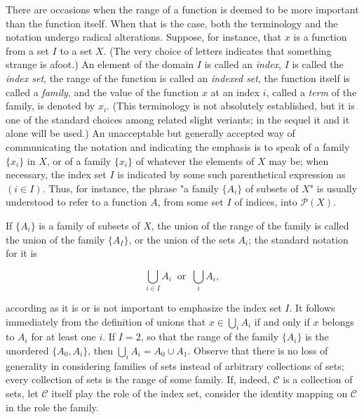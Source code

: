 There are occasions when the range of a function is deemed to be more important than the function itself. When that is the case, both the terminology and the notation undergo radical alterations. Suppose, for instance, that $x$ is a function from a set $I$ to a set $X$. (The very choice of letters indicates that something strange is afoot.) An element of the domain $I$ is called an \textit{index}, $I$ is called the \textit{index set}, the range of the function is called an \textit{indexed set}, the function itself is called a \textit{family}, and the value of the function $x$ at an index $i$, called a \textit{term} of the family, is denoted by $x_{i}$. (This terminology is not absolutely established, but it is one of the standard choices among related slight veriants; in the sequel it and it alone will be used.) An unacceptable but generally accepted way of communicating the notation and indicating the emphasis is to speak of a family $\{ x_{i}  \}$ in $X$, or of a family $\{ x_{i} \}$ of whatever the elements of $X$ may be; when necessary, the index set $I$ is indicated by some such parenthetical expression as $(i \in I)$. Thus, for instance, the phrase "a family $\{ A_{i} \}$ of subsets of $X$" is usually understood to refer to a function $A$, from some set $I$ of indices, into $\mathcal{P}(X)$. 

If $ \{ A_{i} \}$ is a family of subsets of $X$, the union of the range of the family is called the union of the family $\{ A_{I} \}$, or the union of the sets $A_{i}$; the standard notation for it is

\begin{equation*}
\bigcup_{i \in I}A_{i} \: \text{ or } \: \bigcup_{i}A_{i},
\end{equation*}

according as it is or is not important to emphasize the index set $I$. It follows immediately from the definition of unions that $x \in \bigcup_{i} A_{i}$ if and only if $x$ belongs to $A_{i}$ for at least one $i$. If $I = 2$, so that the range of the family $\{ A_{i} \}$ is the unordered $\{ A_{0}, A_{i} \} $, then $\bigcup_{i}A_{i} =  A_{0} \cup A_{1}$. Observe that there is no loss of generality in considering families of sets instead of arbitrary collections of sets; every collection of sets is the range of some family. If, indeed, $\mathcal{C}$ is a collection of sets, let $\mathcal{C}$ itself play the role of the index set, consider the identity mapping on $\mathcal{C}$ in the role the family. 

